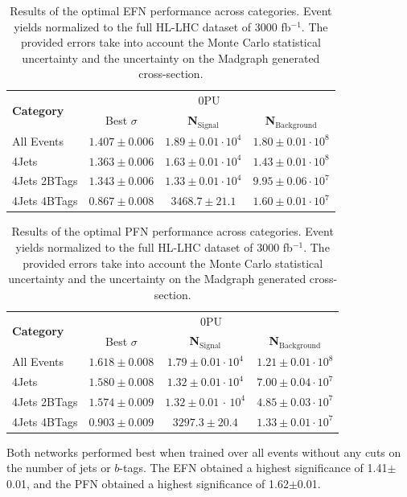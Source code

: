 \begin{table}[ht!]
\centering
    \begin{tabular}{|l|c|c|c|} %
      \hline\hline
      \multirow{2}{*}{\textbf{Category}} & \multicolumn{3}{c|}{0PU}\\
      \cline{2-4}
      & Best $\sigma$ & \textbf{N$_{\mathrm{Signal}}$} & \textbf{N$_{\mathrm{Background}}$} \\
      \hline
      All Events & $1.407 \pm 0.006$ & $1.89\pm 0.01 \cdot 10^4$ & $1.80\pm 0.01 \cdot 10^8$ \\
      4Jets & $1.363 \pm 0.006$ & $1.63\pm 0.01 \cdot 10^4$ & $1.43\pm 0.01 \cdot 10^8$ \\
      4Jets 2BTags & $1.343 \pm 0.006$ & $1.33\pm 0.01 \cdot 10^4$ & $9.95\pm 0.06 \cdot 10^7$ \\
      4Jets 4BTags & $0.867 \pm 0.008$ & $3468.7\pm 21.1 $ & $1.60\pm 0.01 \cdot 10^7$ \\
      \hline\hline
    \end{tabular}
    \caption{Results of the optimal EFN performance across categories. Event yields normalized to the full HL-LHC dataset of 3000 fb$^{-1}$. The provided errors take into account the Monte Carlo statistical uncertainty and the uncertainty on the Madgraph generated cross-section.}
\label{EFNtab}
\end{table}

\begin{table}[ht!]
\centering
    \begin{tabular}{|l|c|c|c|} %
      \hline\hline
      \multirow{2}{*}{\textbf{Category}} & \multicolumn{3}{c|}{0PU}\\
      \cline{2-4}
      & Best $\sigma$ & \textbf{N$_{\mathrm{Signal}}$} & \textbf{N$_{\mathrm{Background}}$} \\
      \hline
      All Events & $1.618 \pm 0.008$ & $1.79\pm 0.01 \cdot 10^4$ & $1.21\pm 0.01 \cdot 10^8$ \\
      4Jets & $1.580 \pm 0.008$ & $1.32\pm 0.01 \cdot 10^4$ & $7.00\pm 0.04 \cdot 10^7$ \\
      4Jets 2BTags & $1.574 \pm 0.009$ & $1.32 \pm 0.01$ $\cdot$ $10^4$ & $4.85\pm 0.03 \cdot 10^7$ \\
      4Jets 4BTags & $0.903 \pm 0.009$ & $3297.3 \pm 20.4$ & $1.33\pm 0.01 \cdot 10^7$ \\
      \hline\hline
    \end{tabular}
    \caption{Results of the optimal PFN performance across categories. Event yields normalized to the full HL-LHC dataset of 3000 fb$^{-1}$. The provided errors take into account the Monte Carlo statistical uncertainty and the uncertainty on the Madgraph generated cross-section.}
\label{PFNtab}
\end{table}

Both networks performed best when trained over all events without any cuts on the number of jets or $b$-tags. The EFN obtained a highest significance of 1.41$\pm$0.01, and the PFN obtained a highest significance of 1.62$\pm$0.01.
